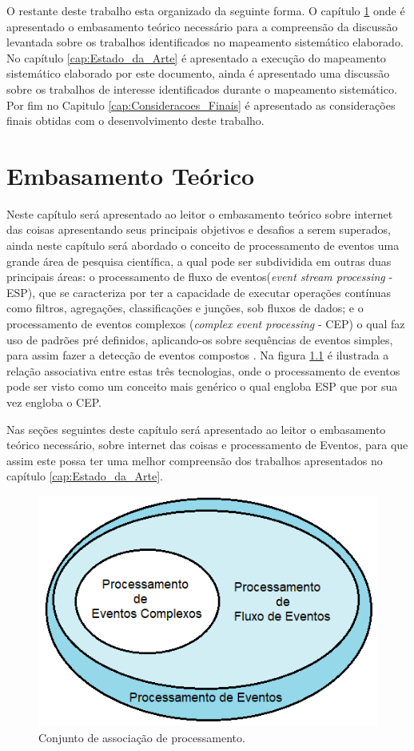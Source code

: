 \documentclass[tid,table]{texufpel} %
\begin{document}
O restante deste trabalho esta organizado da seguinte forma. O capítulo \ref{cap:Embasamento_Teorico} onde é apresentado o embasamento teórico necessário para a compreensão da discussão levantada sobre os trabalhos identificados no mapeamento sistemático elaborado. No capítulo \ref{cap:Estado_da_Arte} é apresentado a execução do mapeamento sistemático elaborado por este documento, ainda é apresentado uma discussão sobre os trabalhos de interesse identificados durante o mapeamento sistemático. Por fim no Capitulo \ref{cap:Consideracoes_Finais} é apresentado as considerações finais obtidas com o desenvolvimento deste trabalho.



\chapter{Embasamento Teórico}
\label{cap:Embasamento_Teorico}

Neste capítulo será apresentado ao leitor o embasamento teórico sobre internet das coisas apresentando seus principais objetivos e desafios a serem superados, ainda neste capítulo será abordado o conceito de processamento de eventos uma grande área de pesquisa científica, a qual pode ser subdividida em outras duas principais áreas: o processamento de fluxo de eventos(\textit{event stream processing} - ESP), que se caracteriza por ter a capacidade de executar operações contínuas como filtros, agregações, classificações e junções, sob fluxos de dados; e o processamento de eventos complexos (\textit{complex event processing} - CEP) o qual faz uso de padrões pré definidos, aplicando-os sobre sequências de eventos simples, para assim fazer a detecção de eventos compostos \cite{dayarathna2018recent}. Na figura \ref{fig:ConjuntoProcessamento} é ilustrada a relação associativa entre estas três tecnologias, onde o processamento de eventos pode ser visto como um conceito mais genérico o qual engloba ESP que por sua vez engloba o CEP.

Nas seções seguintes deste capítulo será apresentado ao leitor o embasamento teórico necessário, sobre internet das coisas e processamento de Eventos, para que assim este possa ter uma melhor compreensão dos trabalhos apresentados no capítulo \ref{cap:Estado_da_Arte}.


\begin{figure}[ht]
	\centering
	\includegraphics[width=.6\textwidth]{imagens/ConjuntoProcessamento.png}
	\caption{Conjunto de associação de processamento.}
	\label{fig:ConjuntoProcessamento}
\end{figure}
\end{document}
